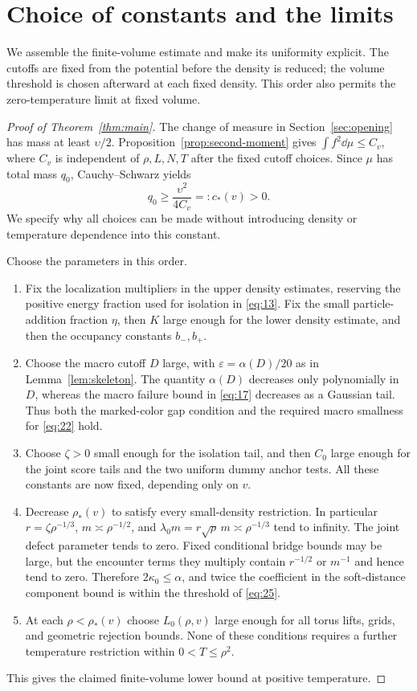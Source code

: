 \section{Choice of constants and the limits}\label{sec:conclusion}

We assemble the finite-volume estimate and make its uniformity explicit.
The cutoffs are fixed from the potential before the density is reduced;
the volume threshold is chosen afterward at each fixed density. This
order also permits the zero-temperature limit at fixed volume.

\begin{proof}[Proof of Theorem~\ref{thm:main}]
The change of measure in Section~\ref{sec:opening} has mass at least
$\upsilon/2$. Proposition~\ref{prop:second-moment} gives
$\int f^2\dd\mu\le C_v$,
where $C_v$ is independent of $\rho,L,N,T$ after the fixed cutoff choices.
Since $\mu$ has total mass $q_0$, Cauchy--Schwarz yields
\[
 q_0\ge \frac{\upsilon^2}{4C_v}=:c_*(v)>0.
\]
We specify why all choices can be made without introducing density
or temperature dependence into this constant.

Choose the parameters in this order.
\begin{enumerate}[label=\textup{(\arabic*)}]
\item Fix the localization multipliers in the upper density estimates,
reserving the positive energy fraction used for isolation in
\eqref{eq:13}. Fix the small particle-addition fraction $\eta$, then
$K$ large enough for the lower density estimate, and then the occupancy
constants $b_-,b_+$.
\item Choose the macro cutoff $D$ large, with
$\varepsilon=\alpha(D)/20$ as in Lemma~\ref{lem:skeleton}.
The quantity $\alpha(D)$ decreases only polynomially in $D$, whereas
the macro failure bound in \eqref{eq:17} decreases as a Gaussian tail.
Thus both the marked-color gap condition and the required macro
smallness for \eqref{eq:22} hold.
\item Choose $\zeta>0$ small enough for the isolation tail, and then
$C_0$ large enough for the joint score tails and the two uniform dummy
anchor tests. All these constants are now fixed, depending only on $v$.
\item Decrease $\rho_*(v)$ to satisfy every small-density restriction.
In particular $r=\zeta\rho^{-1/3}$, $m\asymp\rho^{-1/2}$, and
$\lambda_0m=r\sqrt\rho\,m\asymp\rho^{-1/3}$ tend to infinity.
The joint defect parameter tends to zero. Fixed conditional bridge
bounds may be large, but the encounter terms they multiply contain
$r^{-1/2}$ or $m^{-1}$ and hence tend to zero. Therefore
$2\kappa_0\le\alpha$, and twice the coefficient in the soft-distance
component bound is within the threshold of \eqref{eq:25}.
\item At each $\rho<\rho_*(v)$ choose $L_0(\rho,v)$ large enough for
all torus lifts, grids, and geometric rejection bounds. None of these
conditions requires a further temperature restriction within
$0<T\le\rho^2$.
\end{enumerate}
This gives the claimed finite-volume lower bound at positive temperature.


\end{proof}

